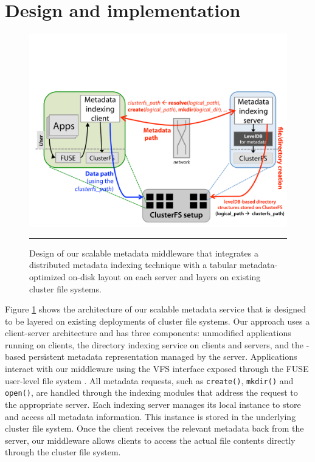 \section{Design and implementation}

\begin{figure}[t]   %
\centerline{\includegraphics[scale=0.3]{./figs/giga-impl-leveldb-clusterfs}}
\caption{
{\small
Design of our scalable metadata middleware that integrates a distributed metadata indexing
technique with a tabular metadata-optimized on-disk layout on each server and
layers on existing cluster file systems. 
}
}
\vspace{10pt}
\hrule 
\label{fig:design}
\end{figure}       %

Figure \ref{fig:design} shows the architecture of our scalable metadata
service that is designed to be layered on existing deployments of cluster file
systems. Our approach uses a client-server architecture and has three components: 
unmodified applications running on clients, the \giga{} directory indexing service 
on clients and servers, and the \ldb{}-based persistent metadata representation 
managed by the server.
Applications interact with our middleware using the VFS interface exposed
through the FUSE user-level file system \citep{fuse}.
All metadata requests, such as \texttt{create()}, \texttt{mkdir()} and
\texttt{open()}, are handled through the \giga indexing modules that address
the request to the appropriate server.
Each indexing server manages its local \ldb instance to store and access all
metadata information. This \ldb instance is stored in the underlying cluster
file system.
Once the client receives the relevant metadata back from the server, our
middleware allows clients to access the actual file contents directly through
the cluster file system.

